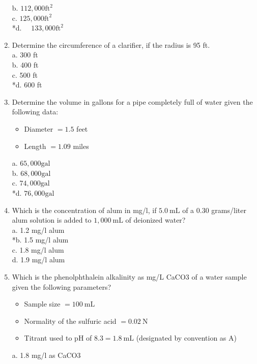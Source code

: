 \begin{enumerate}
b. $112,000 \mathrm{ft}^{2}$\\
c. $125,000 \mathrm{ft}^{2}$\\
*d. $\quad 133,000 \mathrm{ft}^{2}$\\
\item Determine the circumference of a clarifier, if the radius is 95 ft.\\
a. 300 ft\\
b. 400 ft\\
c. 500 ft\\
*d. 600 ft\\
\item Determine the volume in gallons for a pipe completely full of water given the following data:\\
\begin{itemize}
\item Diameter $=1.5$ feet\\
\item Length $=1.09$ miles\\
\end{itemize}
a. $65,000 \mathrm{gal}$\\
b. $68,000 \mathrm{gal}$\\
c. $74,000 \mathrm{gal}$\\
*d. $76,000 \mathrm{gal}$ \\
\item Which is the concentration of alum in mg/l, if $5.0 \mathrm{~mL}$ of a 0.30 grams/liter alum solution is added to $1,000 \mathrm{~mL}$ of deionized water?\\
a. 1.2 mg/l alum\\
*b. 1.5 mg/l alum\\
c. 1.8 mg/l alum\\
d. 1.9 mg/l alum\\
\item Which is the phenolphthalein alkalinity as mg/L CaCO3 of a water sample given the following parameters?\\
\begin{itemize}
\item Sample size $=100 \mathrm{~mL}$\\
\item Normality of the sulfuric acid $=0.02 \mathrm{~N}$\\
\item Titrant used to pH of $8.3=1.8 \mathrm{~mL}$ (designated by convention as A)\\
\end{itemize}
a. 1.8 mg/l as CaCO3\\

\end{enumerate}
